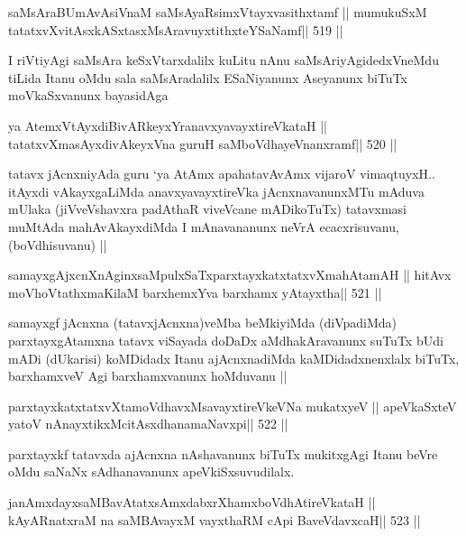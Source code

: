 \begin{shl}
saMsAraBUmAvAsiVnaM saMsAyaRsimxVtayxvasithxtamf ||
mumukuSxM tatatxvXvitAsxkASxtasxMsAravuyxtithxteYSaNamf\hfill || 519 ||
\end{shl}

\begin{artha}
I riVtiyAgi saMsAra keSxVtarxdalilx kuLitu nAnu saMsAriyAgidedxVneMdu
tiLida Itanu oMdu sala saMsAradalilx ESaNiyanunx Aseyanunx biTuTx
moVkaSxvanunx bayasidAga 
\end{artha}

\begin{shl}
ya AtemxVtAyxdiBivARkeyxYranavxyavayxtireVkataH ||
tatatxvXmasAyxdivAkeyxVna guruH saMboVdhayeVnanxramf\hfill || 520 ||
\end{shl}

\begin{artha}
tatavx jAcnxniyAda guru `ya AtAmx apahatavAvAmx vijaroV
vimaqtuyxH.. itAyxdi vAkayxgaLiMda anavxyavayxtireVka jAcnxnavanunxMTu
mAduva mUlaka (jiVveVshavxra padAthaR viveVcane mADikoTuTx) tatavxmasi
muMtAda mahAvAkayxdiMda I mAnavananunx neVrA ecacxrisuvanu,
(boVdhisuvanu) ||
\end{artha}

\begin{shl}
samayxgAjxcnXnAginxsaMpulxSaTxparxtayxkatxtatxvXmahAtamAH ||
hitAvx moVhoVtathxmaKilaM barxhemxYva barxhamx yAtayxtha\hfill || 521 ||
\end{shl}

\begin{artha}
samayxgf jAcnxna (tatavxjAcnxna)veMba beMkiyiMda (diVpadiMda)
parxtayxgAtamxna tatavx viSayada doDaDx aMdhakAravanunx suTuTx bUdi
mADi (dUkarisi) koMDidadx Itanu ajAcnxnadiMda kaMDidadxnenxlalx
biTuTx, barxhamxveV Agi barxhamxvanunx hoMduvanu || 
\end{artha}

\begin{shl}
parxtayxkatxtatxvXtamoVdhavxMsavayxtireVkeVNa mukatxyeV ||
apeVkaSxteV yatoV nAnayxtikxMcitAsxdhanamaNavxpi\hfill || 522 ||
\end{shl}

\begin{artha}
parxtayxkf tatavxda ajAcnxna nAshavanunx biTuTx mukitxgAgi Itanu beVre
oMdu saNaNx sAdhanavanunx apeVkiSxsuvudilalx.
\end{artha}

\begin{shl}
janAmxdayxsaMBavAtatxsAmxdabxrXhamxboVdhAtireVkataH ||
kAyARnatxraM na saMBAvayxM vayxthaRM cApi BaveVdavxcaH\hfill || 523 ||
\end{shl}


